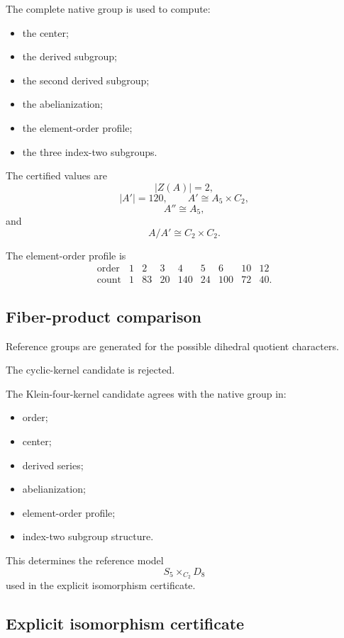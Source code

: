 The complete native group is used to compute:

\begin{itemize}
\item the center;
\item the derived subgroup;
\item the second derived subgroup;
\item the abelianization;
\item the element-order profile;
\item the three index-two subgroups.
\end{itemize}

The certified values are
\[
|Z(A)|=2,
\]
\[
|A'|=120,
\qquad
A'\cong A_5\times C_2,
\]
\[
A''\cong A_5,
\]
and
\[
A/A'\cong C_2\times C_2.
\]

The element-order profile is
\[
\begin{array}{c|rrrrrrrr}
\text{order}
&1&2&3&4&5&6&10&12\\
\hline
\text{count}
&1&83&20&140&24&100&72&40.
\end{array}
\]

\subsection{Fiber-product comparison}

Reference groups are generated for the possible dihedral quotient
characters.

The cyclic-kernel candidate is rejected.

The Klein-four-kernel candidate agrees with the native group in:

\begin{itemize}
\item order;
\item center;
\item derived series;
\item abelianization;
\item element-order profile;
\item index-two subgroup structure.
\end{itemize}

This determines the reference model
\[
S_5\times_{C_2}D_8
\]
used in the explicit isomorphism certificate.

\subsection{Explicit isomorphism certificate}


